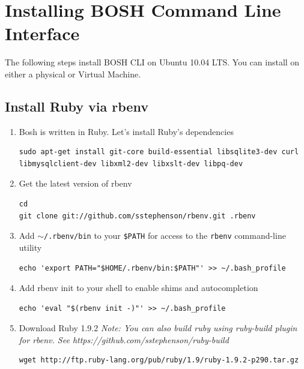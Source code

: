 \section{Installing BOSH Command Line Interface}
\label{bosh_install}

The following steps install BOSH CLI on Ubuntu 10.04 LTS. You can install on either a physical or Virtual Machine.

\subsection{Install Ruby via rbenv}
\label{installrubyviarbenv}

\begin{enumerate}
\item Bosh is written in Ruby. Let's install Ruby's dependencies

\begin{verbatim}
sudo apt-get install git-core build-essential libsqlite3-dev curl libmysqlclient-dev libxml2-dev libxslt-dev libpq-dev
\end{verbatim}


\item Get the latest version of rbenv

\begin{verbatim}
cd
git clone git://github.com/sstephenson/rbenv.git .rbenv
\end{verbatim}


\item Add \texttt{\ensuremath{\sim}\slash .rbenv\slash bin} to your \texttt{\$PATH} for access to the \texttt{rbenv} command-line utility

\begin{verbatim}
echo 'export PATH="$HOME/.rbenv/bin:$PATH"' >> ~/.bash_profile
\end{verbatim}


\item Add rbenv init to your shell to enable shims and autocompletion

\begin{verbatim}
echo 'eval "$(rbenv init -)"' >> ~/.bash_profile
\end{verbatim}


\item Download Ruby 1.9.2
\emph{Note: You can also build ruby using ruby-build plugin for rbenv. See https:/\slash github.com\slash sstephenson\slash ruby-build}

\begin{verbatim}
wget http://ftp.ruby-lang.org/pub/ruby/1.9/ruby-1.9.2-p290.tar.gz
\end{verbatim}



\end{enumerate}
